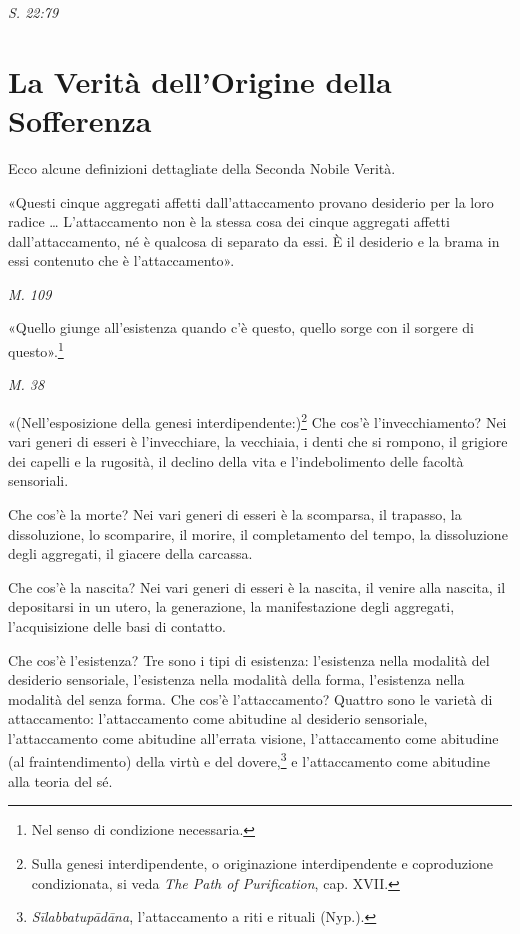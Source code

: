 \emph{S. 22:79}


\hypertarget{x-la-verità-dell’origine-della-sofferenza}{\section*{La Verità dell’Origine della Sofferenza}}
 Ecco alcune definizioni dettagliate della Seconda
Nobile Verità.


 «Questi cinque aggregati affetti dall’attaccamento provano
desiderio per la loro radice …​ L’attaccamento non è la stessa cosa dei
cinque aggregati affetti dall’attaccamento, né è qualcosa di separato da
essi. È il desiderio e la brama in essi contenuto che è l’attaccamento».


\emph{M. 109}


«Quello giunge all’esistenza quando c’è questo, quello sorge con il
sorgere di questo».\footnote{Nel senso di condizione necessaria.}


\emph{M. 38}


«(Nell’esposizione della genesi interdipendente:)\footnote{Sulla genesi interdipendente, o originazione interdipendente e coproduzione condizionata, si veda \emph{The Path of Purification}, cap. XVII.} Che cos’è l’invecchiamento? Nei vari generi di esseri è l’invecchiare, la
vecchiaia, i denti che si rompono, il grigiore dei capelli e la
rugosità, il declino della vita e l’indebolimento delle facoltà
sensoriali.


Che cos’è la morte? Nei vari generi di esseri è la
scomparsa, il trapasso, la dissoluzione, lo scomparire, il morire, il
completamento del tempo, la dissoluzione degli aggregati, il giacere
della carcassa.


Che cos’è la nascita? Nei vari generi di esseri è la
nascita, il venire alla nascita, il depositarsi in un utero, la
generazione, la manifestazione degli aggregati, l’acquisizione delle
basi di contatto.


Che cos’è l’esistenza? Tre sono i tipi di esistenza:
l’esistenza nella modalità del desiderio sensoriale, l’esistenza nella
modalità della forma, l’esistenza nella modalità del senza forma. Che
cos’è l’attaccamento? Quattro sono le varietà di attaccamento:
l’attaccamento come abitudine al desiderio sensoriale, l’attaccamento
come abitudine all’errata visione, l’attaccamento come abitudine (al
fraintendimento) della virtù e del dovere,\footnote{\emph{Sīlabbatupādāna}, l’attaccamento a riti e rituali (Nyp.).} e
l’attaccamento come abitudine alla teoria del sé.


